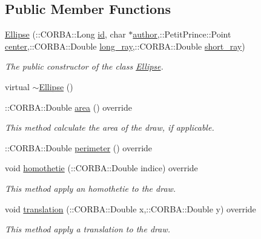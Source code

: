 \subsection*{Public Member Functions}
\begin{DoxyCompactItemize}
\item 
\hyperlink{class_ellipse_af073bec49d45372f9ed8afd4f22dd528}{Ellipse} (\+::C\+O\+R\+B\+A\+::\+Long \hyperlink{class_draw_a1bf27c5a59da9002d55936c947dce2cc}{id}, char $\ast$\hyperlink{class_draw_a4781c654db63e069c8c5be017f6ccc34}{author},\+::Petit\+Prince\+::\+Point \hyperlink{class_ellipse_ad5e117e2df2c0103e89544e3a051f74d}{center},\+::C\+O\+R\+B\+A\+::\+Double \hyperlink{class_ellipse_a5776141608d4d5bbfaac0f2036bf111a}{long\+\_\+ray},\+::C\+O\+R\+B\+A\+::\+Double \hyperlink{class_ellipse_a955c0a05e02b4bb11df206f08c9c7650}{short\+\_\+ray})
\begin{DoxyCompactList}\small\item\em The public constructor of the class \hyperlink{class_ellipse}{Ellipse}. \end{DoxyCompactList}\item 
virtual \hyperlink{class_ellipse_a5ab8160e6bf40ced81490d6d83d33d89}{$\sim$\+Ellipse} ()
\item 
\+::C\+O\+R\+B\+A\+::\+Double \hyperlink{class_ellipse_a74ed2332ecafb22f8eb2484f85039697}{area} () override
\begin{DoxyCompactList}\small\item\em This method calculate the area of the draw, if applicable. \end{DoxyCompactList}\item 
\+::C\+O\+R\+B\+A\+::\+Double \hyperlink{class_ellipse_a6ac85ef20816de34cf540808dd7fe573}{perimeter} () override
\item 
void \hyperlink{class_ellipse_af73259e055705e0dab10e5671c4031de}{homothetie} (\+::C\+O\+R\+B\+A\+::\+Double indice) override
\begin{DoxyCompactList}\small\item\em This method apply an homothetie to the draw. \end{DoxyCompactList}\item 
void \hyperlink{class_ellipse_ac5d0cb3f7beb9b62688ecf06b8c7f193}{translation} (\+::C\+O\+R\+B\+A\+::\+Double x,\+::C\+O\+R\+B\+A\+::\+Double y) override
\begin{DoxyCompactList}\small\item\em This method apply a translation to the draw. \end{DoxyCompactList}\item 

\end{DoxyCompactItemize}

